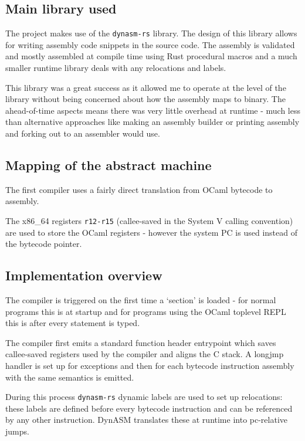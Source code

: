 \subsection{Main library used}

The project makes use of the \texttt{dynasm-rs} library. The design of this library allows for
writing assembly code snippets in the source code. The assembly is validated and mostly assembled
at compile time using Rust procedural macros and a much smaller runtime library deals with any
relocations and labels.

This library was a great success as it allowed me to operate at the level of the library without
being concerned about how the assembly maps to binary. The ahead-of-time aspects means there was
very little overhead at runtime - much less than alternative approaches like making an assembly
builder or printing assembly and forking out to an assembler would use.

\subsection{Mapping of the abstract machine}

The first compiler uses a fairly direct translation from OCaml bytecode to assembly.

The x86\_64 registers \texttt{r12-r15} (callee-saved in the System V calling convention) are used
to store the OCaml registers - however the system PC is used instead of the bytecode pointer.

\subsection{Implementation overview}

The compiler is triggered on the first time a `section' is loaded - for normal programs this is at
startup and for programs using the OCaml toplevel REPL this is after every statement is typed.

The compiler first emits a standard function header entrypoint which saves callee-saved registers
used by the compiler and aligns the C stack. A longjmp handler is set up for exceptions and then
for each bytecode instruction assembly with the same semantics is emitted.

During this process \texttt{dynasm-rs} dynamic labels are used to set up relocations: these
labels are defined before every bytecode instruction and can be referenced by any other
instruction. DynASM translates these at runtime into pc-relative jumps.

